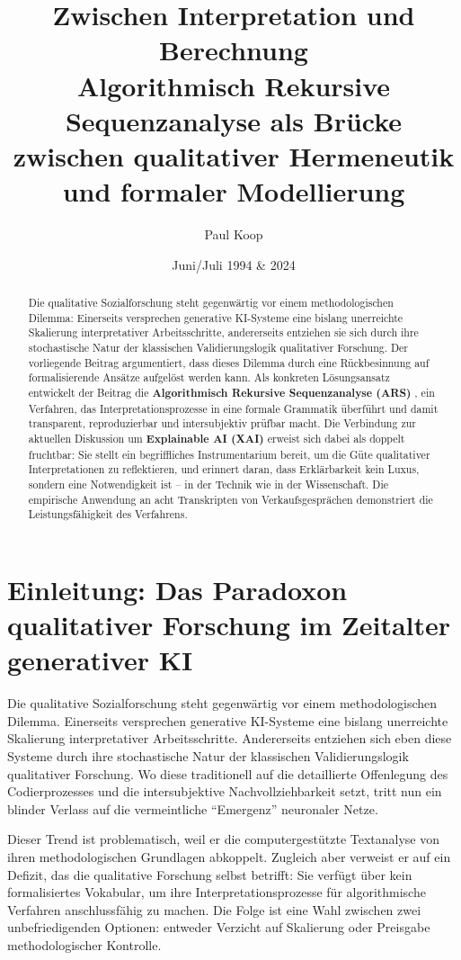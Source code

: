 \documentclass[
  12pt,
  a4paper,
  oneside,
  titlepage
]{article}
\title{\Huge\textbf{Zwischen Interpretation und Berechnung} \\
       \LARGE Algorithmisch Rekursive Sequenzanalyse als Brücke \\
       \LARGE zwischen qualitativer Hermeneutik und formaler Modellierung}
\author{
  \large
  \begin{tabular}{c}
    Paul Koop
  \end{tabular}
}
\date{\large Juni/Juli 1994 \& 2024}
\begin{document}
\maketitle

\begin{abstract}
Die qualitative Sozialforschung steht gegenwärtig vor einem methodologischen Dilemma: 
Einerseits versprechen generative KI-Systeme eine bislang unerreichte Skalierung 
interpretativer Arbeitsschritte, andererseits entziehen sie sich durch ihre stochastische 
Natur der klassischen Validierungslogik qualitativer Forschung. Der vorliegende Beitrag 
argumentiert, dass dieses Dilemma durch eine Rückbesinnung auf formalisierende Ansätze 
aufgelöst werden kann. Als konkreten Lösungsansatz entwickelt der Beitrag die 
\textbf{Algorithmisch Rekursive Sequenzanalyse (ARS)} , ein Verfahren, das 
Interpretationsprozesse in eine formale Grammatik überführt und damit transparent, 
reproduzierbar und intersubjektiv prüfbar macht. Die Verbindung zur aktuellen Diskussion 
um \textbf{Explainable AI (XAI)} erweist sich dabei als doppelt fruchtbar: Sie stellt ein 
begriffliches Instrumentarium bereit, um die Güte qualitativer Interpretationen zu 
reflektieren, und erinnert daran, dass Erklärbarkeit kein Luxus, sondern eine Notwendigkeit 
ist – in der Technik wie in der Wissenschaft. Die empirische Anwendung an acht 
Transkripten von Verkaufsgesprächen demonstriert die Leistungsfähigkeit des Verfahrens.
\end{abstract}

\newpage
\tableofcontents
\newpage

\section{Einleitung: Das Paradoxon qualitativer Forschung im Zeitalter generativer KI}

Die qualitative Sozialforschung steht gegenwärtig vor einem methodologischen Dilemma. 
Einerseits versprechen generative KI-Systeme eine bislang unerreichte Skalierung 
interpretativer Arbeitsschritte. Andererseits entziehen sich eben diese Systeme durch 
ihre stochastische Natur der klassischen Validierungslogik qualitativer Forschung. 
Wo diese traditionell auf die detaillierte Offenlegung des Codierprozesses und die 
intersubjektive Nachvollziehbarkeit setzt, tritt nun ein blinder Verlass auf die 
vermeintliche \enquote{Emergenz} neuronaler Netze.

Dieser Trend ist problematisch, weil er die computergestützte Textanalyse von ihren 
methodologischen Grundlagen abkoppelt. Zugleich aber verweist er auf ein Defizit, das 
die qualitative Forschung selbst betrifft: Sie verfügt über kein formalisiertes 
Vokabular, um ihre Interpretationsprozesse für algorithmische Verfahren anschlussfähig 
zu machen. Die Folge ist eine Wahl zwischen zwei unbefriedigenden Optionen: entweder 
Verzicht auf Skalierung oder Preisgabe methodologischer Kontrolle.
\end{document}
